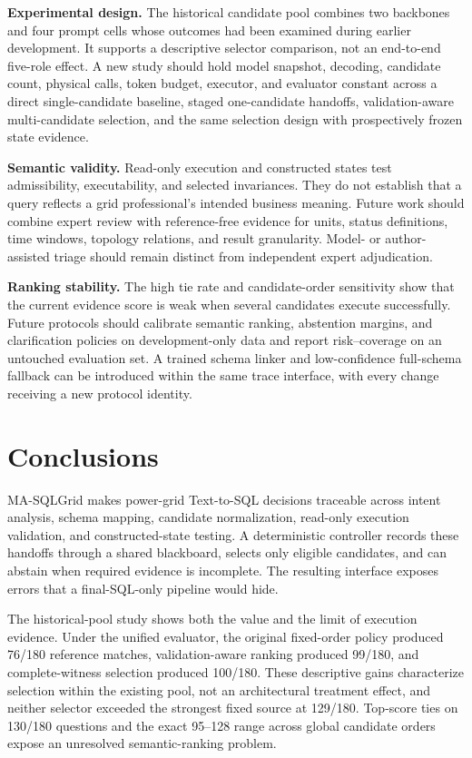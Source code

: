 \documentclass[applsci,article,submit,moreauthors]{Definitions/mdpi}
\newcommand{\masql}{MA-SQLGrid}
\begin{document}
\textbf{Experimental design.} The historical candidate pool combines two backbones and four prompt cells whose outcomes had been examined during earlier development. It supports a descriptive selector comparison, not an end-to-end five-role effect. A new study should hold model snapshot, decoding, candidate count, physical calls, token budget, executor, and evaluator constant across a direct single-candidate baseline, staged one-candidate handoffs, validation-aware multi-candidate selection, and the same selection design with prospectively frozen state evidence.

\textbf{Semantic validity.} Read-only execution and constructed states test admissibility, executability, and selected invariances. They do not establish that a query reflects a grid professional's intended business meaning. Future work should combine expert review with reference-free evidence for units, status definitions, time windows, topology relations, and result granularity. Model- or author-assisted triage should remain distinct from independent expert adjudication.

\textbf{Ranking stability.} The high tie rate and candidate-order sensitivity show that the current evidence score is weak when several candidates execute successfully. Future protocols should calibrate semantic ranking, abstention margins, and clarification policies on development-only data and report risk--coverage on an untouched evaluation set. A trained schema linker and low-confidence full-schema fallback can be introduced within the same trace interface, with every change receiving a new protocol identity.

\section{Conclusions}

\masql{} makes power-grid Text-to-SQL decisions traceable across intent analysis, schema mapping, candidate normalization, read-only execution validation, and constructed-state testing. A deterministic controller records these handoffs through a shared blackboard, selects only eligible candidates, and can abstain when required evidence is incomplete. The resulting interface exposes errors that a final-SQL-only pipeline would hide.

The historical-pool study shows both the value and the limit of execution evidence. Under the unified evaluator, the original fixed-order policy produced 76/180 reference matches, validation-aware ranking produced 99/180, and complete-witness selection produced 100/180. These descriptive gains characterize selection within the existing pool, not an architectural treatment effect, and neither selector exceeded the strongest fixed source at 129/180. Top-score ties on 130/180 questions and the exact 95--128 range across global candidate orders expose an unresolved semantic-ranking problem.
\end{document}
